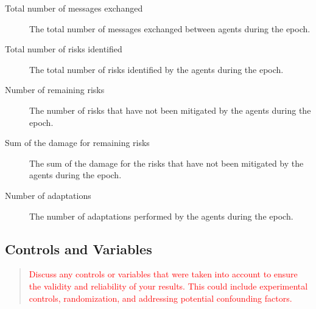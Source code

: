 \begin{description}
    \item[Total number of messages exchanged] The total number of messages exchanged between agents during the epoch.
    \item[Total number of risks identified] The total number of risks identified by the agents during the epoch.
    \item[Number of remaining risks] The number of risks that have not been mitigated by the agents during the epoch.
    \item[Sum of the damage for remaining risks] The sum of the damage for the risks that have not been mitigated by the agents during the epoch.
    \item[Number of adaptations] The number of adaptations performed by the agents during the epoch.
\end{description}

\subsection{Controls and Variables}
\label{ssec:controls-variables}
\begin{quote}\textcolor{red}{
    Discuss any controls or variables that were taken into account to ensure the validity and reliability of your results. This could include experimental controls, randomization, and addressing potential confounding factors.
}\end{quote}




